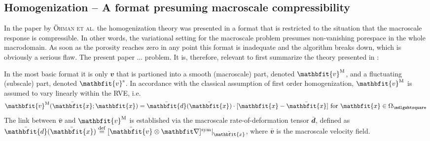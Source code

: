 \documentclass[12pt,a4paper,fleqn]{article}
\renewcommand{\ta}[1]{\mathbfit{#1}}
\renewcommand{\ts}[1]{\mathbfit{#1}}
\renewcommand{\Box}{\mdlgwhtsquare}
\begin{document}
\subsection{Homogenization -- A format presuming macroscale compressibility}\label{sec:homogencompress}

In the paper by \textsc{Öhman et al.} \cite{Ohman2011a} the homogenization theory was presented in a format that is restricted to the situation that the macroscale response is compressible. In other words, the variational setting for the macroscale problem presumes non-vanishing porespace in the whole macrodomain. As soon as the porosity reaches zero in any point this format is inadequate and the algorithm breaks down, which is obviously a serious flaw. The present paper ... problem. It is, therefore, relevant to first summarize the theory presented in \cite{Ohman2011a}:

In the most basic format it is only $\ta v$ that is partioned into a smooth (macroscale) part, denoted $\ta{v}^\macro$, and a fluctuating (subscale) part, denoted $\ta{v}^\fluct$. In accordance with the classical assumption of first order homogenization, $\ta{v}^\macro$ is assumed to vary linearly within the RVE, i.e.
\begin{equation}
  \ta{v}^\macro(\bar{\ta{x}};\ta x) = \bar{\ts d}(\bar{\ta x}) \cdot [\ta{x}-\bar{\ta x}] \text{ for }\ta{x}\in\Omega_{\Box}
\label{eq:vm_prolongation}
\end{equation}
The link between $\bar{\ta v}$ and $\ta v^\macro$ is established via the macroscale rate-of-deformation tensor $\bar{\ts d}$, defined as
$\bar{\ts d}(\bar{\ta x})\defeq [\bar{\ta v}\outerp \diff]^\sym|_{\bar{\ta x}}$, where $\bar{\ta v}$ is the macroscale velocity field.
\end{document}
